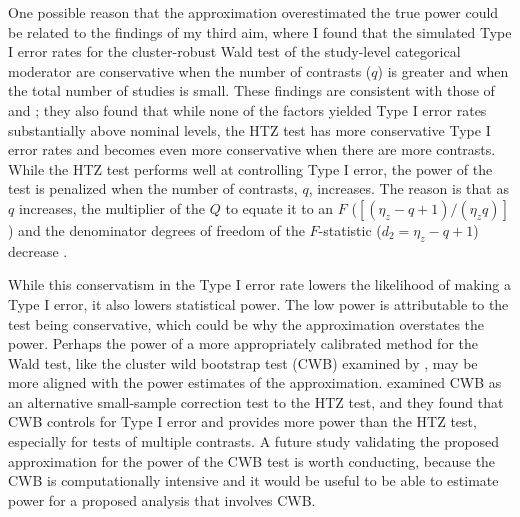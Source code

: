 One possible reason that the approximation overestimated the true power could be related to the findings of my third aim, where I found that the simulated Type I error rates for the cluster-robust Wald test of the study-level categorical moderator are conservative when the number of contrasts ($q$) is greater and when the total number of studies is small. These findings are consistent with those of \textcite{tipton2015b} and \textcite{joshi_cluster_2022}; they also found that while none of the factors yielded Type I error rates substantially above nominal levels, the HTZ test has more conservative Type I error rates and becomes even more conservative when there are more contrasts. While the HTZ test performs well at controlling Type I error, the power of the test is penalized when the number of contrasts, $q$, increases. The reason is that as $q$ increases, the multiplier of the $Q$ to equate it to an $F$ ($[(\eta_z - q +1)/(\eta_zq)]$) and the denominator degrees of freedom of the $F$-statistic ($d_2 = \eta_z - q +1$) decrease \autocite{tipton2015b}. 

While this conservatism in the Type I error rate lowers the likelihood of making a Type I error, it also lowers statistical power. The low power is attributable to the test being conservative, which could be why the approximation overstates the power. Perhaps the power of a more appropriately calibrated method for the Wald test, like the cluster wild bootstrap test (CWB) examined by \textcite{joshi_cluster_2022}, may be more aligned with the power estimates of the approximation.  
\textcite{joshi_cluster_2022} examined CWB as an alternative small-sample correction test to the HTZ test, and they found that CWB controls for Type I error and provides more power than the HTZ test, especially for tests of multiple contrasts. A future study validating the proposed approximation for the power of the CWB test is worth conducting, because the CWB is computationally intensive and it would be useful to be able to estimate power for a proposed analysis that involves CWB. 

